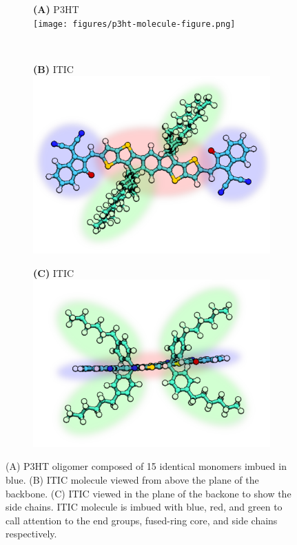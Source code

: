\begin{figure}
\centering
\begin{subfigure}{.5\textwidth}
    \centering
    \textbf{(A)} P3HT \\
    \texttt{[image: figures/p3ht-molecule-figure.png]}
\end{subfigure}%
\\
\begin{subfigure}{.3\textwidth}
    \textbf{(B)} ITIC
    \centering
    \includegraphics[width=\textwidth]{figures/itic-backbone-figure.png}
\end{subfigure}%
\begin{subfigure}{.3\textwidth}
    \textbf{(C)} ITIC
    \centering
    \includegraphics[width=\textwidth]{figures/itic-sidechain-figure.png}
\end{subfigure}
    \caption[short]{(A) P3HT oligomer composed of 15 identical monomers imbued in blue.
    (B) ITIC molecule viewed from above the plane of the backbone. 
    (C) ITIC viewed in the plane of the backone to show the side chains. ITIC
    molecule is imbued with blue, red, and green to call attention to the end groups, fused-ring core, and
    side chains respectively.}
\label{molecules}
\end{figure}


